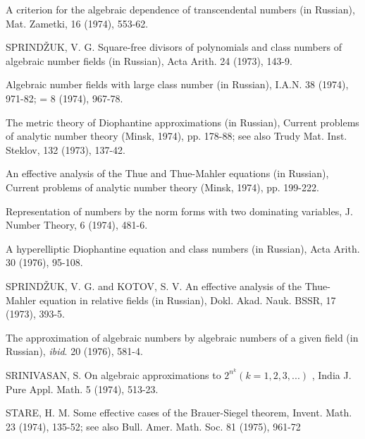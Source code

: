 \begin{hanglist}
    \item \hspace{1.5em} A criterion for the algebraic dependence of transcendental numbers (in Russian), Mat. Zametki, 16 (1974), 553-62.
    \item SPRINDŽUK, V. G. Square-free divisors of polynomials and class numbers of algebraic number fields (in Russian), Acta Arith. 24 (1973), 143-9.
    \item \hspace{1.5em} Algebraic number fields with large class number (in Russian), I.A.N. 38 (1974), 971-82; = 8 (1974), 967-78.
    \item \hspace{1.5em} The metric theory of Diophantine approximations (in Russian), Current problems of analytic number theory (Minsk, 1974), pp. 178-88; see also Trudy Mat. Inst. Steklov, 132 (1973), 137-42.
    \item \hspace{1.5em} An effective analysis of the Thue and Thue-Mahler equations (in Russian), Current problems of analytic number theory (Minsk, 1974), pp. 199-222.
    \item \hspace{1.5em} Representation of numbers by the norm forms with two dominating variables, J. Number Theory, 6 (1974), 481-6.
    \item \hspace{1.5em} A hyperelliptic Diophantine equation and class numbers (in Russian), Acta Arith. 30 (1976), 95-108.
    \item SPRINDŽUK, V. G. and KOTOV, S. V. An effective analysis of the Thue-Mahler equation in relative fields (in Russian), Dokl. Akad. Nauk. BSSR, 17 (1973), 393-5.
    \item \hspace{1.5em} The approximation of algebraic numbers by algebraic numbers of a given field (in Russian), \textit{ibid}. 20 (1976), 581-4.
    \item SRINIVASAN, S. On algebraic approximations to  $2^{n^k}(k=1,2,3,...)$ , India J. Pure Appl. Math. 5 (1974), 513-23.
    \item STARE, H. M. Some effective cases of the Brauer-Siegel theorem, Invent. Math. 23 (1974), 135-52; see also Bull. Amer. Math. Soc. 81 (1975), 961-72

\end{hanglist}
